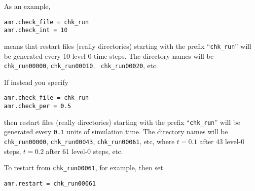 As an example,
\begin{lstlisting}
amr.check_file = chk_run
amr.check_int = 10
\end{lstlisting}
means that restart files (really directories) starting with the prefix
``{\tt chk\_run}'' will be generated every 10 level-0 time steps.  The
directory names will be {\tt chk\_run00000}, {\tt chk\_run00010}, {\tt
chk\_run00020}, etc.

If instead you specify
\begin{lstlisting}
amr.check_file = chk_run
amr.check_per = 0.5
\end{lstlisting}
then restart files (really directories) starting with the prefix
``{\tt chk\_run}'' will be generated every {\tt 0.1} units of
simulation time.  The directory names will be {\tt chk\_run00000},
{\tt chk\_run00043}, {\tt chk\_run00061}, etc, where $t = 0.1$ after
43 level-0 steps, $t = 0.2$ after 61 level-0 steps, etc.


To restart from {\tt chk\_run00061}, for example, then set 
\begin{lstlisting}
amr.restart = chk_run00061
\end{lstlisting}


